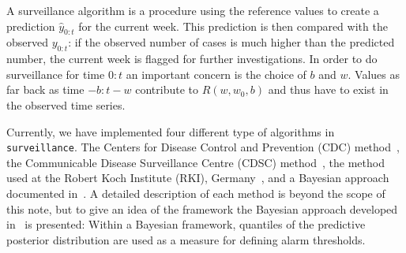 \documentclass[a4paper,11pt]{article}
\newcommand{\surveillance}{\texttt{surveillance}}
\begin{document}
A surveillance algorithm is a procedure using the reference values
to create a prediction $\hat{y}_{0:t}$ for the current week.  This
prediction is then compared with the observed $y_{0:t}$: if the
observed number of cases is much higher than the predicted number, the
current week is flagged for further investigations. In order to do
surveillance for time $0:t$ an important concern is the choice of $b$
and $w$. Values as far back as time $-b:t-w$ contribute to
$R(w,w_0,b)$ and thus have to exist in the observed time series.

Currently, we have implemented four different type of algorithms in
\surveillance.  The Centers for Disease Control and Prevention (CDC)
method~\citep{stroup89}, the Communicable Disease Surveillance Centre
(CDSC) method~\citep{farrington96}, the method used at the Robert Koch
Institute (RKI), Germany~\citep{altmann2003}, and a Bayesian approach
documented in~\citet{riebler2004}. A detailed description of each
method is beyond the scope of this note, but to give an idea of the
framework the Bayesian approach developed in~\citet{riebler2004} is
presented: Within a Bayesian framework, quantiles of the predictive
posterior distribution are used as a measure for defining alarm
thresholds.
\end{document}
